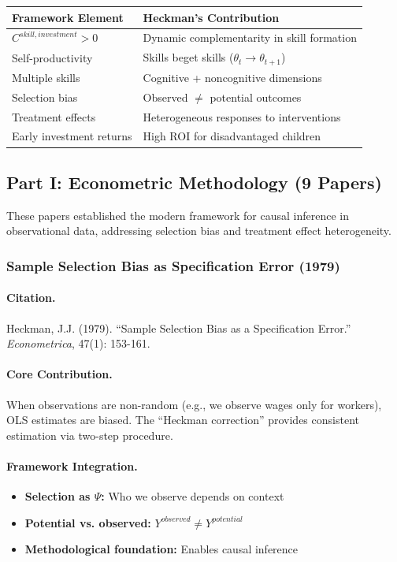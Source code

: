 \begin{center}
\renewcommand{\arraystretch}{1.2}
\small
\begin{tabular}{ll}
\hline
\textbf{Framework Element} & \textbf{Heckman's Contribution} \\
\hline
$C^{skill,investment} > 0$ & Dynamic complementarity in skill formation \\
Self-productivity & Skills beget skills ($\theta_t \to \theta_{t+1}$) \\
Multiple skills & Cognitive + noncognitive dimensions \\
Selection bias & Observed $\neq$ potential outcomes \\
Treatment effects & Heterogeneous responses to interventions \\
Early investment returns & High ROI for disadvantaged children \\
\hline
\end{tabular}
\end{center}

\subsection{Part I: Econometric Methodology (9 Papers)}

These papers established the modern framework for causal inference in
observational data, addressing selection bias and treatment effect heterogeneity.

\subsubsection{Sample Selection Bias as Specification Error (1979)}

\paragraph{Citation.}
Heckman, J.J. (1979). ``Sample Selection Bias as a Specification Error.''
\emph{Econometrica}, 47(1): 153-161.

\paragraph{Core Contribution.}
When observations are non-random (e.g., we observe wages only for workers),
OLS estimates are biased. The ``Heckman correction'' provides consistent
estimation via two-step procedure.

\paragraph{Framework Integration.}
\begin{itemize}
  \item \textbf{Selection as $\Psi$:} Who we observe depends on context
  \item \textbf{Potential vs. observed:} $Y^{observed} \neq Y^{potential}$
  \item \textbf{Methodological foundation:} Enables causal inference
\end{itemize}

